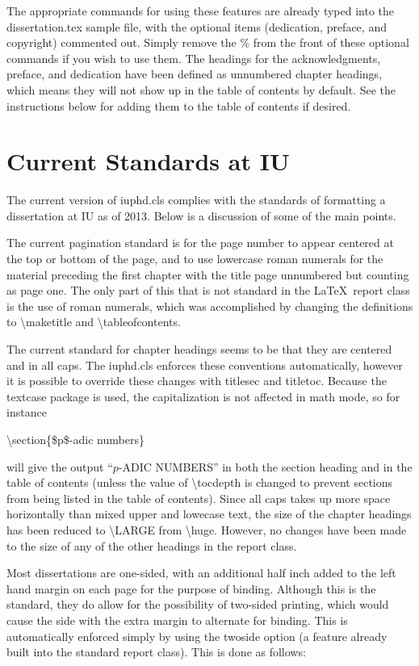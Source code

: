 The appropriate commands for using these features are already typed into the dissertation.tex sample file,
with the optional items (dedication, preface, and copyright) commented out.  Simply remove the \% from the front
of these optional commands if you wish to use them.  The headings for the acknowledgments, preface, and dedication have
been defined as unnumbered chapter headings, which means they will not show up in the table of contents by default.
See the instructions below for adding them to the table of contents if desired.

\section{Current Standards at IU}
The current version of iuphd.cls complies with the standards of formatting a dissertation at IU as of 2013.  Below is a discussion of
some of the main points.

The current pagination standard is for the page number to appear centered at the top or bottom of the
page, and to use lowercase roman numerals for the material preceding the first chapter with the title page unnumbered but counting as
page one. The only part of this that is not standard in the \LaTeX \ report class is the use of roman numerals, which was accomplished
by changing the definitions to \textbackslash maketitle and \textbackslash tableofcontents.

The current standard for chapter headings seems to be that they are centered and in all caps.  The iuphd.cls enforces these
conventions automatically, however it is possible to override these changes with titlesec and titletoc. Because the textcase package is used,
the capitalization is not affected in math mode, so for instance
\medskip

\textbackslash section\{\$p\$-adic numbers\}
\medskip

\noindent will give the output ``$p$-ADIC NUMBERS'' in both the section heading and in the table of contents
(unless the value of \textbackslash tocdepth is changed to prevent sections from being listed in the table of contents).
Since all caps takes up more space horizontally than mixed upper and lowecase text, the size of the chapter headings
has been reduced to \textbackslash LARGE from \textbackslash huge.  However, no changes have been made to the size of any of the
other headings in the report class.

Most dissertations are one-sided, with an additional half inch added to the left hand margin on each page for the purpose of binding.
Although this is the standard, they do allow for the possibility of two-sided printing, which would cause the side with the extra margin
to alternate for binding.  This is automatically enforced simply by using the twoside option (a feature already built into the
standard report class). This is done as follows:
\medskip

